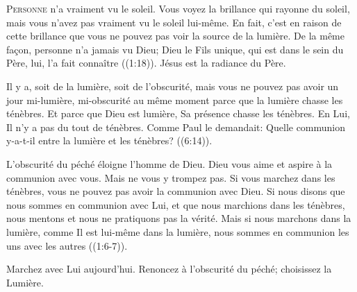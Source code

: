 \dvrule






\lettrine{P}{ersonne} n'a vraiment vu le soleil. Vous voyez la brillance
 qui rayonne du soleil, mais vous n'avez pas vraiment vu le soleil lui-même.
 En fait, c'est en raison de cette brillance que vous ne pouvez pas voir
 la source de la lumière. De la même fa\c{c}on,
 \Og personne 
 n'a jamais vu Dieu; Dieu le Fils unique, qui est dans le sein du Père, lui,
 l'a fait connaître \Fg{} ((1:18)).
 Jésus est la radiance du Père.


Il y a, soit de la lumière, soit de l'obscurité, mais vous ne pouvez pas
 avoir un jour mi-lumière, mi-obscurité au même moment parce que la lumière
 chasse les ténèbres. Et parce que Dieu est lumière, Sa présence chasse
 les ténèbres. En Lui, Il n'y a pas du tout de ténèbres.
 Comme Paul le demandait: 
 \Og Quelle communion y-a-t-il entre la lumière et les ténèbres? \Fg{}
 ((6:14)).

L'obscurité du péché éloigne l'homme de Dieu. Dieu vous aime et aspire
 à la communion avec vous. Mais ne vous y trompez pas.
 Si vous marchez dans les ténèbres, vous ne pouvez pas avoir
 la communion avec Dieu.
 \Og Si nous disons que nous sommes en communion avec Lui,
 et que nous marchions dans les ténèbres, nous mentons et nous ne pratiquons
 pas la vérité. Mais si nous marchons dans la lumière,
 comme Il est lui-même dans la lumière, nous sommes en communion
 les uns avec les autres \Fg{} ((1:6-7)).

Marchez avec Lui aujourd'hui. Renoncez à l'obscurité du péché;
 choisissez la Lumière.


\dvrule



